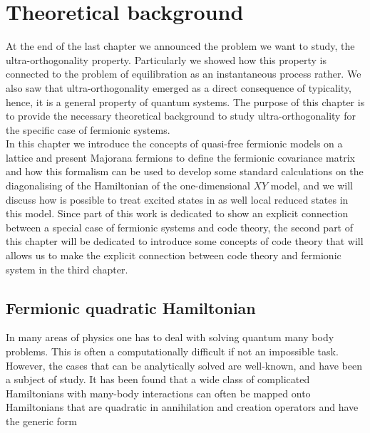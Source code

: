 \chapter{ Theoretical background }
At the end of the last chapter we announced the problem we want to study, the ultra-orthogonality property. Particularly we showed how this property is connected to the problem of equilibration as an instantaneous process rather. We also saw that ultra-orthogonality emerged as a direct consequence of typicality, hence, it is a general property of quantum systems. The purpose of this chapter is to provide the necessary theoretical background to study ultra-orthogonality for the specific case of fermionic systems.\\
\indent In this chapter we introduce the concepts of quasi-free fermionic models on a lattice and present Majorana fermions to define the fermionic covariance matrix and how this formalism can be used to develop some standard calculations on the diagonalising of the Hamiltonian of the one-dimensional $XY$ model, and we will discuss how is possible to treat excited states in as well local reduced states in this model. Since part of this work is dedicated to show an explicit connection between a special case of fermionic systems and code theory, the second part of this chapter will be dedicated to introduce some concepts of code theory that will allows us to make the explicit connection between code theory and fermionic system in the third chapter.

\section{Fermionic quadratic Hamiltonian}
In many areas of physics one has to deal with solving quantum many body problems. This is often a computationally difficult if not an impossible task. However, the cases that can be analytically solved are well-known, and have been a subject of study\cite{noauthor_density_2007,niu_majorana_2012,reyes-lega_aspects_2016,chung_density-matrix_2001,leijnse_introduction_2012, molinari_notes_2017,botero_bcs-like_2004, bravyi_lagrangian_2004, lieb_two_1961, latorre_ground_2004, katsura_statistical_1962, barouch_statistical_1971, barouch_statistical_1970}. It has been found that a wide class of complicated Hamiltonians with many-body interactions can often be mapped onto Hamiltonians that are quadratic in annihilation and creation operators and have the generic form \cite{botero_bcs-like_2004}

